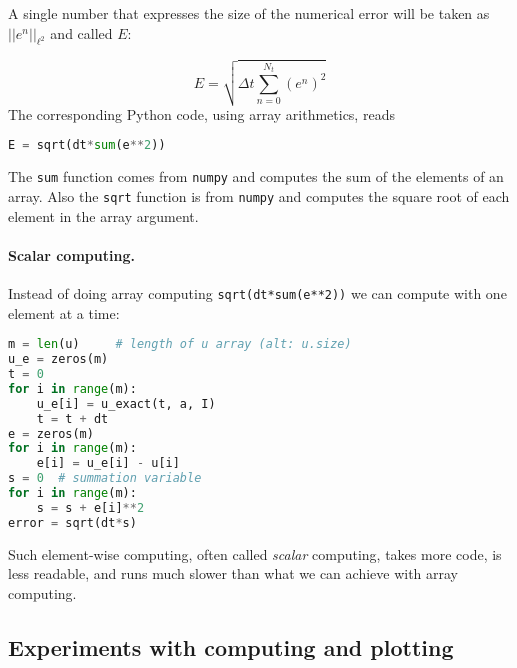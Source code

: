 \documentclass[graybox,sectrefs,envcountresetchap,open=right,final]{svmonodo}
\begin{document}

A single number that expresses the size of the numerical error
will be taken as $||e^n||_{\ell^2}$ and called $E$:

\begin{equation}
E = \sqrt{\Delta t\sum_{n=0}^{N_t} (e^n)^2}
\label{decay:E}
\end{equation}
The corresponding Python code, using array arithmetics, reads



\begin{lstlisting}[language=python,style=blue1_bluegreen]
E = sqrt(dt*sum(e**2))

\end{lstlisting}

The \texttt{sum} function comes from \texttt{numpy} and computes the sum of the elements
of an array. Also the \texttt{sqrt} function is from \texttt{numpy} and computes the
square root of each element in the array argument.


\paragraph{Scalar computing.}
Instead of doing array computing \texttt{sqrt(dt*sum(e**2))} we can compute with
one element at a time:














\begin{lstlisting}[language=python,style=blue1_bluegreen]
m = len(u)     # length of u array (alt: u.size)
u_e = zeros(m)
t = 0
for i in range(m):
    u_e[i] = u_exact(t, a, I)
    t = t + dt
e = zeros(m)
for i in range(m):
    e[i] = u_e[i] - u[i]
s = 0  # summation variable
for i in range(m):
    s = s + e[i]**2
error = sqrt(dt*s)

\end{lstlisting}

Such element-wise computing, often called \emph{scalar} computing, takes
more code, is less readable, and runs much slower than what we
can achieve with array computing.

\subsection{Experiments with computing and plotting}
\end{document}
